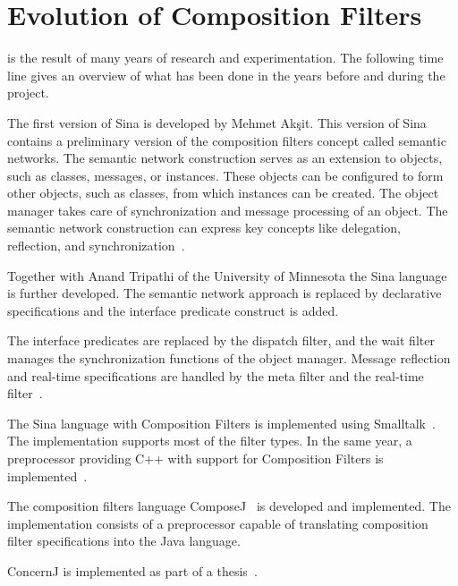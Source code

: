\section{Evolution of Composition Filters}
\Compose* is the result of many years of research and experimentation.
The following time line gives an overview of what has been done in the years before and during the \Compose* project.
\begin{description}[noitemsep,style=nextline,leftmargin=15mm]
\item[1985] The first version of Sina is developed by Mehmet Ak\c{s}it.
            This version of Sina contains a preliminary version of the composition filters concept called semantic networks.
            The semantic network construction serves as an extension to objects, such as classes, messages, or instances.
            These objects can be configured to form other objects, such as classes, from which instances can be created.
            The object manager takes care of synchronization and message processing of an object.
            The semantic network construction can express key concepts like delegation, reflection, and synchronization~\cite{koopmans:sina95}.
\item[1987] Together with Anand Tripathi of the University of Minnesota the Sina language is further developed.
            The semantic network approach is replaced by declarative specifications and the interface predicate construct is added.
\item[1991] The interface predicates are replaced by the dispatch filter, and the wait filter manages the synchronization functions of the object manager.
            Message reflection and real-time specifications are handled by the meta filter and the real-time filter~\cite{bergmans:phd94}.
\item[1995] The Sina language with Composition Filters is implemented using Smalltalk~\cite{koopmans:sina95}.
            The implementation supports most of the filter types.
            In the same year, a preprocessor providing C++ with support for Composition Filters is implemented~\cite{glandrup:ms95}.
\item[1999] The composition filters language ComposeJ~\cite{wichman:ms99} is developed and implemented.
            The implementation consists of a preprocessor capable of translating composition filter specifications into the Java language.
\item[2001] ConcernJ is implemented as part of a \MSc thesis~\cite{salinas:ms01}.

\end{description}
